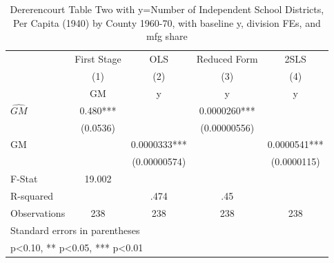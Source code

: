 \begin{table}[htbp]\centering
\def\sym#1{\ifmmode^{#1}\else\(^{#1}\)\fi}
\caption{Dererencourt Table Two with y=Number of Independent School Districts, Per Capita (1940) by County 1960-70, with baseline y, division FEs, and mfg share}
\begin{tabular}{l*{4}{c}}
\toprule
                    & First Stage   &         OLS   &Reduced Form   &        2SLS   \\
                    &\multicolumn{1}{c}{(1)}&\multicolumn{1}{c}{(2)}&\multicolumn{1}{c}{(3)}&\multicolumn{1}{c}{(4)}\\
                    &\multicolumn{1}{c}{GM}&\multicolumn{1}{c}{y}&\multicolumn{1}{c}{y}&\multicolumn{1}{c}{y}\\
\midrule
$\hat{GM}$          &       0.480***&               &   0.0000260***&               \\
                    &    (0.0536)   &               &(0.00000556)   &               \\
\addlinespace
GM                  &               &   0.0000333***&               &   0.0000541***\\
                    &               &(0.00000574)   &               & (0.0000115)   \\
\midrule
F-Stat              &      19.002   &               &               &               \\
R-squared           &               &        .474   &         .45   &               \\
Observations        &         238   &         238   &         238   &         238   \\
\bottomrule
\multicolumn{5}{l}{\footnotesize Standard errors in parentheses}\\
\multicolumn{5}{l}{\footnotesize * p<0.10, ** p<0.05, *** p<0.01}\\
\end{tabular}
\end{table}
